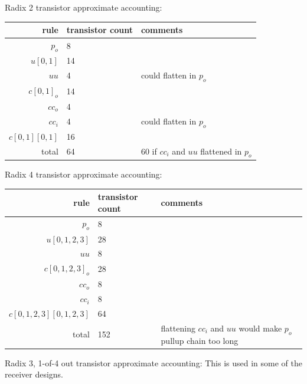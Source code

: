 \documentclass{article}
\begin{document}
\noindent
Radix 2 transistor approximate accounting:

\begin{center}
    \begin{tabular}{|r|l|l|}
    \hline
    rule & transistor count & comments \\ \hline
    $p_o$ & 8 & \\ \hline
    $u[0,1]$ & 14 & \\ \hline
    $uu$ & 4 & could flatten in $p_o$ \\ \hline
    $c[0,1]_o$ & 14 & \\ \hline
    $cc_o$ & 4 & \\ \hline
    $cc_i$ & 4 & could flatten in $p_o$ \\ \hline
    $c[0,1][0,1]$ & 16 & \\ \hline
    \hline total & 64 & 60 if $cc_i$ and $uu$ flattened in $p_o$ \\ \hline
    \end{tabular}
\end{center}

\noindent
Radix 4 transistor approximate accounting:

\begin{center}
    \begin{tabular}{|r|l|l|}
    \hline
    rule & transistor count & comments \\ \hline
    $p_o$ & 8 & \\ \hline
    $u[0,1,2,3]$ & 28 & \\ \hline
    $uu$ & 8 & \\ \hline
    $c[0,1,2,3]_o$ & 28 & \\ \hline
    $cc_o$ & 8 & \\ \hline
    $cc_i$ & 8 & \\ \hline
    $c[0,1,2,3][0,1,2,3]$ & 64 & \\ \hline
    \hline total & 152 & flattening $cc_i$ and $uu$ would make $p_o$ pullup chain too long \\ \hline
    \end{tabular}
\end{center}

\noindent
Radix 3, 1-of-4 out transistor approximate accounting: This is used in some of the receiver
designs.
\end{document}
